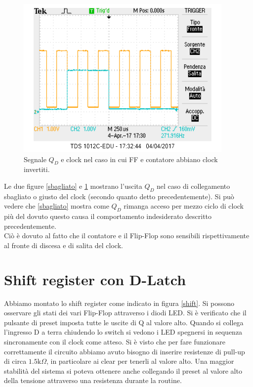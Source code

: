 \documentclass[10pt,a4paper]{article}
\begin{document}
\begin{figure}
\centering
\includegraphics[scale=1.0]{clockgiusto.png}
\caption{Segnale $Q_D$ e clock nel caso in cui FF e contatore abbiano clock invertiti.\label{giusto}}
\end{figure}

Le due figure \ref{sbagliato} e \ref{giusto} mostrano l'uscita $Q_D$ nel caso di collegamento sbagliato o giusto del clock (secondo quanto detto precedentemente). Si può vedere che \ref{sbagliato} mostra come $Q_D$ rimanga acceso per mezzo ciclo di clock più del dovuto questo causa il comportamento indesiderato descritto precedentemente.\\
Ciò è dovuto al fatto che il contatore e il Flip-Flop sono sensibili rispettivamente al fronte di discesa e di salita del clock.\\

\section{Shift register con D-Latch}
Abbiamo montato lo shift register come indicato in figura \ref{shift}. Si possono osservare gli stati dei vari Flip-Flop attraverso i diodi LED. Si è verificato che il pulsante di preset imposta tutte le uscite di Q al valore alto. Quando si collega l'ingresso D a terra chiudendo lo switch si vedono i LED spegnersi in sequenza sincronamente con il clock come atteso. Si è visto che per fare funzionare correttamente il circuito abbiamo avuto bisogno di inserire resistenze di pull-up di circa $1.5 \mbox{k}\Omega$, in particolare ai clear per tenerli al valore alto. Una maggior stabilità del sistema si poteva ottenere anche collegando il preset al valore alto della tensione attraverso una resistenza durante la routine.%
\end{document}
